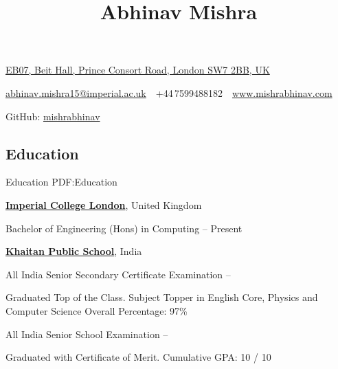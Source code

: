 \documentclass[letterpaper,10pt,oneside]{article}
\newcommand{\CVAuthor}{Abhinav Mishra}
\newcommand{\GitHub}{http://www.github.com/mishrabhinav}
\begin{document}

\title{\CVAuthor}

\begin{subtitle}
\href{https://www.google.co.uk/maps/place/Imperial+College+Union,+Prince+Consort+Rd,+Kensington,+London+SW7+2BB}
{EB07, Beit Hall, Prince Consort Road, London SW7 2BB, UK}
\par
\href{mailto:abhinav.mishra15@imperial.ac.uk}
{abhinav.mishra15@imperial.ac.uk}
\,\SubBulletSymbol\,
+44\,7599488182
\,\SubBulletSymbol\,
\href{www.mishrabhinav.com}
{www.mishrabhinav.com}
\par
GitHub: \href{\GitHub}{mishrabhinav}
\end{subtitle}

\begin{body}


\section
{Education}
{Education}
{PDF:Education}

\href{http://www.imperial.ac.uk}
{\textbf{Imperial College London}},
United Kingdom

\GapNoBreak

\BulletItem
Bachelor of Engineering (Hons) in
Computing
\hfill
{} --
Present
\begin{detail}
\end{detail}

\BigGap
\href{http://www.thekhaitanschool.org}
{\textbf{Khaitan Public School}},
India

\GapNoBreak
\BulletItem
All India Senior Secondary Certificate Examination
\href{#}
{}
\hfill
{} --
\begin{detail}
\SubBulletItem
Graduated Top of the Class.
\SubBulletItem
Subject Topper in English Core, Physics and Computer Science
\SubBulletItem
Overall Percentage: 97\%
\end{detail}

\GapNoBreak
\BulletItem
All India Senior School Examination
\href{#}
{}
\hfill
{} --
\begin{detail}
\SubBulletItem
Graduated with Certificate of Merit.
\SubBulletItem
Cumulative GPA: 10 / 10
\end{detail}


\end{body}
\end{document}
